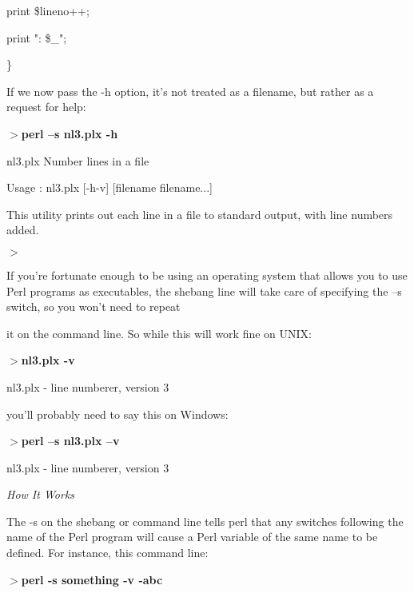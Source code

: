 \documentclass[a4paper,11pt]{book}
\begin{document}
\noindent print \$lineno++;

\noindent print ": \$\_";

\noindent \}

\noindent 

\noindent 

\noindent If we now pass the -h option, it's not treated as a filename, but rather as a request for help:

\noindent 

\noindent $>$\textbf{perl --s nl3.plx -h}

\noindent nl3.plx  Number lines in a file

\noindent 

\noindent Usage : nl3.plx [-h\textbar -v] [filename filename...]

\noindent 

\noindent This utility prints out each line in a file to standard output, with line numbers added.

\noindent $>$

\noindent 

\noindent If you're fortunate enough to be using an operating system that allows you to use Perl programs as executables, the shebang line will take care of specifying the --s switch, so you won't need to repeat

\noindent it on the command line. So while this will work fine on UNIX:

\noindent 

\noindent $>$\textbf{nl3.plx -v}

\noindent nl3.plx - line numberer, version 3

\noindent 

\noindent you'll probably need to say this on Windows:

\noindent 

\noindent $>$\textbf{perl --s nl3.plx --v}

\noindent nl3.plx - line numberer, version 3

\noindent 

\noindent \textit{How It Works}

\noindent The -s on the shebang or command line tells perl that any switches following the name of the Perl program will cause a Perl variable of the same name to be defined. For instance, this command line:

\noindent 

\noindent $>$\textbf{perl -s something -v -abc}

\noindent 
\end{document}
